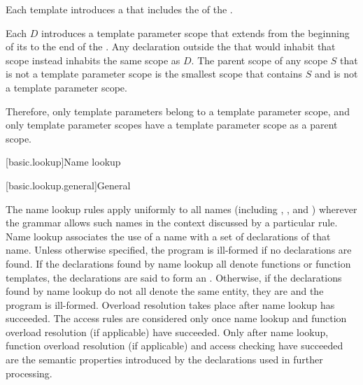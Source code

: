 \pnum
Each template  introduces
a 
that includes the  of
the .

\pnum
Each  $D$ introduces
a template parameter scope
that extends from the beginning of its 
to the end of the .
Any declaration outside the 
that would inhabit that scope instead inhabits the same scope as $D$.
The parent scope of any scope $S$ that is not a template parameter scope
is the smallest scope that contains $S$ and is not a template parameter scope.
\begin{note}
Therefore, only template parameters belong to a template parameter scope, and
only template parameter scopes have
a template parameter scope as a parent scope.
\end{note}


[basic.lookup]{Name lookup}%


[basic.lookup.general]{General}%
%

\pnum
The name lookup rules apply uniformly to all names (including
,
, and
) wherever the grammar allows
such names in the context discussed by a particular rule. Name lookup
associates the use of a name with a set of declarations of
that name.
Unless otherwise specified,
the program is ill-formed if no declarations are found.
If the declarations found by name lookup
all denote functions or function templates,
the declarations are said to form an .
Otherwise,
if the declarations found by name lookup do not all denote the same entity,
%
they are  and the program is ill-formed.
Overload resolution
takes place after name lookup has succeeded. The access rules
are considered only once name lookup and
function overload resolution (if applicable) have succeeded. Only after
name lookup, function overload resolution (if applicable) and access
checking have succeeded
are the semantic properties introduced by the declarations
used in further processing.

